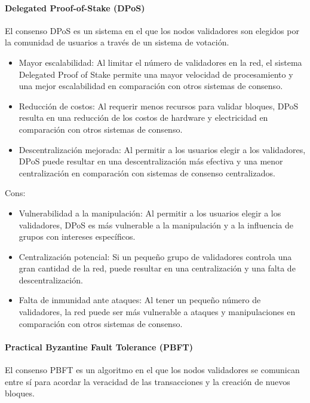 \paragraph{Delegated Proof-of-Stake (DPoS)} El consenso DPoS es un sistema en el que los nodos validadores son elegidos por la comunidad de usuarios a través de un sistema de votación.

\bigskip

\begin{itemize}
    \item Mayor escalabilidad: Al limitar el número de validadores en la red, el sistema Delegated Proof of Stake permite una mayor velocidad de procesamiento y una mejor escalabilidad en comparación con otros sistemas de consenso.
    \item Reducción de costos: Al requerir menos recursos para validar bloques, DPoS resulta en una reducción de los costos de hardware y electricidad en comparación con otros sistemas de consenso.
    \item Descentralización mejorada: Al permitir a los usuarios elegir a los validadores, DPoS puede resultar en una descentralización más efectiva y una menor centralización en comparación con sistemas de consenso centralizados.
\end{itemize}

Cons:

\begin{itemize}
    \item Vulnerabilidad a la manipulación: Al permitir a los usuarios elegir a los validadores, DPoS es más vulnerable a la manipulación y a la influencia de grupos con intereses específicos.
    \item Centralización potencial: Si un pequeño grupo de validadores controla una gran cantidad de la red, puede resultar en una centralización y una falta de descentralización.
    \item Falta de inmunidad ante ataques: Al tener un pequeño número de validadores, la red puede ser más vulnerable a ataques y manipulaciones en comparación con otros sistemas de consenso.
\end{itemize}

\newpage

\paragraph{Practical Byzantine Fault Tolerance (PBFT)} El consenso PBFT es un algoritmo en el que los nodos validadores se comunican entre sí para acordar la veracidad de las transacciones y la creación de nuevos bloques.

